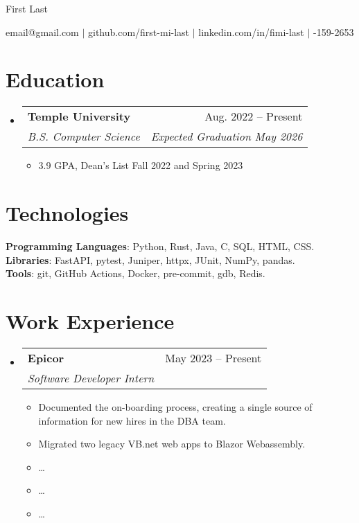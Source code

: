 \documentclass[letterpaper,11pt]{article}
\makeatletter
\newcommand{\resumeItem}[1]{
  \item\small{
    {#1 \vspace{-2pt}}
  }
}
\newcommand{\resumeSubheading}[4]{
  \vspace{-2pt}\item
    \begin{tabular*}{0.97\textwidth}[t]{l@{\extracolsep{\fill}}r}
      \textbf{#1} & #2 \\
      \textit{\small#3} & \textit{\small #4} \\
    \end{tabular*}\vspace{-7pt}
}
\newcommand{\resumeSubheadingListStart}{\begin{itemize}[leftmargin=0.15in, label={}]}
\newcommand{\resumeSubheadingListEnd}{\end{itemize}}
\newcommand{\resumeItemListStart}{\begin{itemize}}
\newcommand{\resumeItemListEnd}{\end{itemize}\vspace{-5pt}}
\newcommand{\myemail}{email@gmail.com}
\newcommand{\myname}{First Last}
\newcommand{\mygh}{github.com/first-mi-last}
\newcommand{\mylinkedin}{linkedin.com/in/fimi-last}
\newcommand{\myphone}{314-159-2653}
\newcommand{\myemail}{jonathanzhang929@gmail.com}
\newcommand{\myname}{Jonathan Zhang}
\newcommand{\mygh}{github.com/jonathan-d-zhang}
\newcommand{\mylinkedin}{linkedin.com/in/jd-zhang}
\newcommand{\myphone}{484-986-8012}
\makeatother
\begin{document}
{\Huge \myname}
\\
\vspace{2pt}

\small{
    \faEnvelope
    \thinspace \thinspace
    \myemail
    \thinspace \thinspace $|$
    \faGithub
    \thinspace \thinspace
    \mygh
    \thinspace \thinspace $|$
    \faLinkedin
    \thinspace \thinspace
    \mylinkedin
    \thinspace \thinspace $|$
    \faPhone
    \thinspace \thinspace
    \myphone
}

\vspace{-11pt}

\section{Education}
  \resumeSubheadingListStart
    \resumeSubheading{Temple University}{Aug. 2022 -- Present}{B.S. Computer Science}{Expected Graduation May 2026}
    \resumeItemListStart
        \resumeItem{3.9 GPA, Dean's List Fall 2022 and Spring 2023}
    \resumeItemListEnd
  \resumeSubheadingListEnd

\section{Technologies}
 \begin{itemize}[leftmargin=0.15in, label={}]
    \small{\item{
    \textbf{Programming Languages}{:
        Python,
        Rust,
        Java,
        C,
        SQL,
        HTML,
        CSS.
    } \\
    \textbf{Libraries}{:
        FastAPI,
        pytest,
        Juniper,
        httpx,
        JUnit,
        NumPy,
        pandas.
    } \\
    \textbf{Tools}{:
        git,
        GitHub Actions,
        Docker,
        pre-commit,
        gdb,
        Redis.
    }
    }}
 \end{itemize}


\section{Work Experience}
    \resumeSubheadingListStart
        \resumeSubheading{Epicor}{May 2023 -- Present}{Software Developer Intern}{}
        \resumeItemListStart
            \resumeItem{Documented the on-boarding process, creating a single source of information for new hires in the DBA team.}
            \resumeItem{Migrated two legacy VB.net web apps to Blazor Webassembly.}
            \resumeItem{\dots}
            \resumeItem{\dots}
            \resumeItem{\dots}
        \resumeItemListEnd
    \resumeSubheadingListEnd
\end{document}
